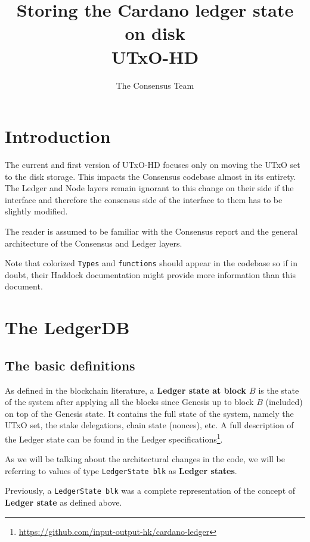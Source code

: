 \documentclass[11pt,a4paper]{article}
\title{Storing the Cardano ledger state on disk\\
       {\large \sc UTxO-HD}}
\author{The Consensus Team}
\newcommand{\htt}[1]{\texttt{#1}}
\theoremstyle{definition}
\begin{document}
\maketitle

\tableofcontents

\section{Introduction}

The current and first version of UTxO-HD focuses only on moving the UTxO set to
the disk storage. This impacts the Consensus codebase almost in its entirety.
The Ledger and Node layers remain ignorant to this change on their side if the
interface and therefore the consensus side of the interface to them has to be
slightly modified.

The reader is assumed to be familiar with the Consensus report and the general
architecture of the Consensus and Ledger layers.

Note that colorized \htt{Types} and \htt{functions} should appear in the
codebase so if in doubt, their Haddock documentation might provide more
information than this document.

\section{The LedgerDB}

\subsection{The basic definitions}

As defined in the blockchain literature, a \textbf{Ledger state at block $B$} is
the state of the system after applying all the blocks since Genesis up to block
$B$ (included) on top of the Genesis state. It contains the full state of the
system, namely the UTxO set, the stake delegations, chain state (nonces), etc. A
full description of the Ledger state can be found in the Ledger
specifications\footnote{\href{https://github.com/input-output-hk/cardano-ledger}{https://github.com/input-output-hk/cardano-ledger}}.

As we will be talking about the architectural changes in the code, we will be
referring to values of type \htt{LedgerState blk} as \textbf{Ledger states}.

Previously, a \htt{LedgerState blk} was a complete representation of the
concept of \textbf{Ledger state} as defined above.
\end{document}
